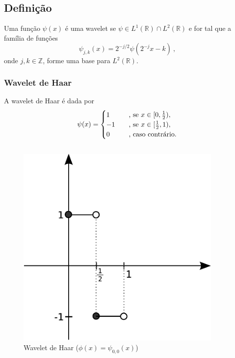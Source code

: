 \subsection{Definição}
\begin{frame}%
  Uma função $\psi(x)$ é uma wavelet se $\psi \in L^1(\mathbb{R}) \cap L^2(\mathbb{R})$
  e for tal que a família de funções
  \begin{equation}
        \psi_{j,k} (x) = 2^{-j/2} \psi(2^{-j} x - k) \ ,
  \end{equation}
  onde $j,k \in \mathbb{Z}$, forme uma base para $L^2(\mathbb{R})$.
\end{frame}

\begin{frame}[allowframebreaks]
  \frametitle{Wavelet de Haar}
  A wavelet de Haar é dada por
  \begin{equation}
        \psi(x) = \begin{cases} 1 \quad & \textmd{, se } x \in [0,\frac{1}{2}) ,\\
         -1 \quad & \textmd{, se } x \in [\frac{1}{2},1) ,\\
     0 &  \textmd{, caso contrário.} \end{cases}
  \end{equation}

  \framebreak 

  \begin{columns}[c]
  \begin{figure}[htp]
  \centering
  \includegraphics[width=0.9\textwidth]{images/haar_00.pdf}
  \caption{Wavelet de Haar ($\phi(x) = \psi_{0,0}(x)$)}
  \label{fig-haar_00}
  \end{figure}


\end{columns}
\end{frame}
